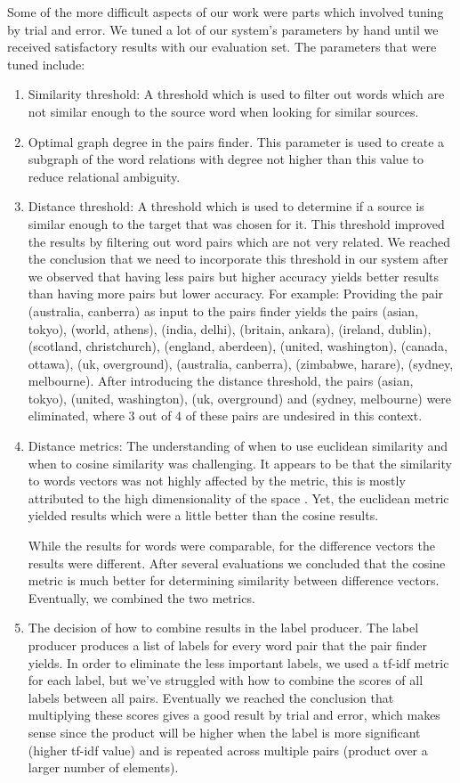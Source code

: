 \documentclass[11pt,a4paper]{article}
\begin{document}
Some of the more difficult aspects of our work were parts which involved tuning by trial and error. We tuned a lot of our system's parameters by hand until we received satisfactory results with our evaluation set. The parameters that were tuned include:
\begin{enumerate}
\item Similarity threshold: A threshold which is used to filter out words which are not similar enough to the source word when looking for similar sources.
\item Optimal graph degree in the pairs finder. This parameter is used to create a subgraph of the word relations with degree not higher than this value to reduce relational ambiguity.
\item Distance threshold: A threshold which is used to determine if a source is similar enough to the target that was chosen for it. This threshold improved the results by filtering out word pairs which are not very related. We reached the conclusion that we need to incorporate this threshold in our system after we observed that having less pairs but higher accuracy yields better results than having more pairs but lower accuracy.
For example: Providing the pair (australia, canberra) as input to the pairs finder yields the pairs (asian, tokyo), (world, athens), (india, delhi), (britain, ankara), (ireland, dublin), (scotland, christchurch), (england, aberdeen), (united, washington), (canada, ottawa), (uk, overground), (australia, canberra), (zimbabwe, harare), (sydney, melbourne). After introducing the distance threshold, the pairs (asian, tokyo), (united, washington), (uk, overground) and (sydney, melbourne) were eliminated, where 3 out of 4 of these pairs are undesired in this context.

\item Distance metrics: The understanding of when to use euclidean similarity and when to cosine similarity was challenging. It appears to be that the similarity to words vectors was not highly affected by the metric, this is mostly attributed to the high dimensionality of the space \cite{qian2004similarity}. Yet, the euclidean metric yielded results which were a little better than the cosine results.

While the results for words were comparable, for the difference vectors the results were different. After several evaluations we concluded that the cosine metric is much better for determining similarity between difference vectors. Eventually, we combined the two metrics.

\item The decision of how to combine results in the label producer. The label producer produces a list of labels for every word pair that the pair finder yields. In order to eliminate the less important labels, we used a tf-idf metric for each label, but we've struggled with how to combine the scores of all labels between all pairs. Eventually we reached the conclusion that multiplying these scores gives a good result by trial and error, which makes sense since the product will be higher when the label is more significant (higher tf-idf value) and is repeated across multiple pairs (product over a larger number of elements).
\end{enumerate}
\end{document}
